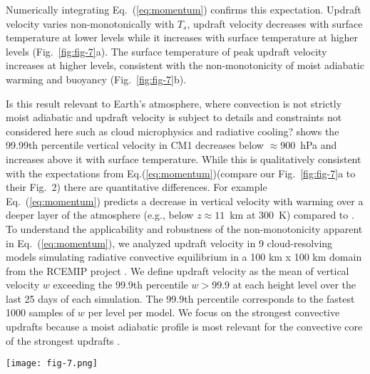 \documentclass[draft,twocol]{ametsocV6.1}
\begin{document}
Numerically integrating Eq.~(\ref{eq:momentum}) confirms this expectation. Updraft velocity varies non-monotonically with $T_s$, updraft velocity decreases with surface temperature at lower levels while it increases with surface temperature at higher levels (Fig.~\ref{fig:fig-7}a). The surface temperature of peak updraft velocity increases at higher levels, consistent with the non-monotonicity of moist adiabatic warming and buoyancy (Fig.~\ref{fig:fig-7}b).

Is this result relevant to Earth's atmosphere, where convection is not strictly moist adiabatic and updraft velocity is subject to details and constraints not considered here such as cloud microphysics and radiative cooling? \cite{singh2015} shows the 99.99th percentile vertical velocity in CM1 decreases below $\approx900$~hPa and increases above it with surface temperature. While this is qualitatively consistent with the expectations from Eq.(\ref{eq:momentum})(compare our Fig.~\ref{fig:fig-7}a to their Fig.~2) there are quantitative differences. For example Eq.~(\ref{eq:momentum}) predicts a decrease in vertical velocity with warming over a deeper layer of the atmosphere (e.g., below $z\approx11$~km at 300~K) compared to \cite{singh2015}. To understand the applicability and robustness of the non-monotonicity apparent in Eq.~(\ref{eq:momentum}), we analyzed updraft velocity in 9 cloud-resolving models simulating radiative convective equilibrium in a 100 km x 100 km domain from the RCEMIP project \citep{wing2018}. We define updraft velocity as the mean of vertical velocity $w$ exceeding the 99.9th percentile $w>{99.9}$ at each height level over the last 25 days of each simulation. The 99.9th percentile corresponds to the fastest 1000 samples of $w$ per level per model. We focus on the strongest convective updrafts because a moist adiabatic profile is most relevant for the convective core of the strongest updrafts \citep{riehl1958}.

\begin{figure*}[htbp]
 \centering
 \texttt{[image: fig-7.png]}\\
 \caption{(a) Vertical profiles of updraft velocity, calculated by numerically integrating Eq.~(\ref{eq:momentum}) in height using buoyancy $B$ from Eq.~(\ref{eq:buoyancy_def}). Updraft velocity decreases with surface temperature at lower levels while it increases with surface temperature at higher levels. (b) Updraft velocity varies non-monotonically with surface temperature at all levels, e.g. at 5, 10, 15, and 20~km. Updraft velocity peaks at warmer surface temperatures at higher levels consistent with the behavior of buoyancy (Fig.~\ref{fig:fig-6}a) and moist adiabatic warming (Fig.~\ref{fig:fig-5}).}\label{fig:fig-7}
\end{figure*}
\end{document}
